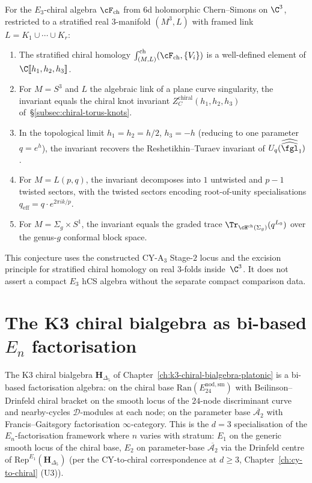 \begin{conjecture}
\label{conj:chiral-homology-3folds}
\ClaimStatusConjectured
For the $E_3$-chiral algebra $\cF_{\mathrm{ch}}$ from $6$d holomorphic Chern--Simons on $\C^3$, restricted to a stratified real $3$-manifold $(M^3, L)$ with framed link $L = K_1 \cup \cdots \cup K_r$:
\begin{enumerate}[label=\textup{(\roman*)}]
 \item The stratified chiral homology $\int_{(M, L)}^{\mathrm{ch}} (\cF_{\mathrm{ch}}, \{V_i\})$ is a well-defined element of $\C[\![h_1, h_2, h_3]\!]$.
 \item For $M = S^3$ and $L$ the algebraic link of a plane curve singularity, the invariant equals the chiral knot invariant $Z_C^{\mathrm{chiral}}(h_1, h_2, h_3)$ of~\S\ref{subsec:chiral-torus-knots}.
 \item In the topological limit $h_1 = h_2 = h/2$, $h_3 = -h$ (reducing to one parameter $q = e^h$), the invariant recovers the Reshetikhin--Turaev invariant of $U_q(\widehat{\widehat{\fgl}}_1)$.
 \item For $M = L(p,q)$, the invariant decomposes into $1$ untwisted and $p-1$ twisted sectors, with the twisted sectors encoding root-of-unity specialisations $q_{\mathrm{eff}} = q \cdot e^{2\pi i k/p}$.
 \item For $M = \Sigma_g \times S^1$, the invariant equals the graded trace $\Tr_{\cH^{\mathrm{ch}}(\Sigma_g)}(q^{L_0})$ over the genus-$g$ conformal block space.
\end{enumerate}
This conjecture uses the constructed CY-A$_3$ Stage-$2$ locus and the excision principle for stratified chiral homology on real $3$-folds inside~$\C^3$. It does not assert a compact $E_3$ hCS algebra without the separate compact comparison data.
\end{conjecture}

\section{The K3 chiral bialgebra as bi-based \texorpdfstring{$E_n$}{E-n} factorisation}
\label{sec:en-fact-K3-bibased}

\begin{remark}
\label{rem:en-fact-bi-based}
The K3 chiral bialgebra $\mathbf{H}_{\Delta_5}$ of Chapter~\ref{ch:k3-chiral-bialgebra-platonic} is a bi-based factorisation algebra: on the chiral base $\mathrm{Ran}(E^{\mathrm{nod,sm}}_{24})$ with Beilinson--Drinfeld chiral bracket on the smooth locus of the $24$-node discriminant curve and nearby-cycles $\mathcal{D}$-modules at each node; on the parameter base $\overline{\mathcal{A}_2}$ with Francis--Gaitsgory factorisation $\infty$-category. This is the $d=3$ specialisation of the $E_n$-factorisation framework where $n$ varies with stratum: $E_1$ on the generic smooth locus of the chiral base, $E_2$ on parameter-base $\overline{\mathcal{A}_2}$ via the Drinfeld centre of $\mathrm{Rep}^{E_1}(\mathbf{H}_{\Delta_5})$ (per the CY-to-chiral correspondence at $d\geq 3$, Chapter~\ref{ch:cy-to-chiral} (U3)).
\end{remark}

